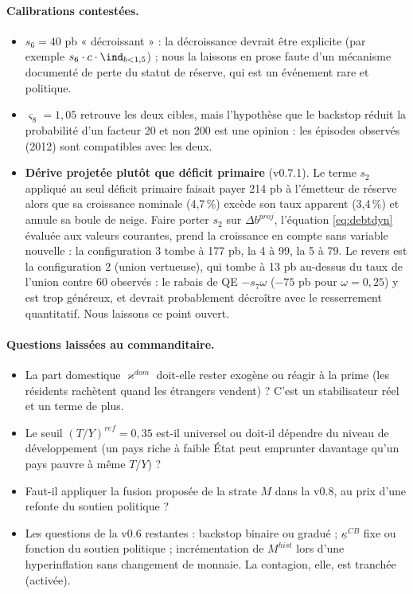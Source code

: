 \documentclass[11pt,a4paper]{article}
\newcommand{\og}{« }
\newcommand{\fg}{ »}
\begin{document}
\paragraph{Calibrations contestées.}
\begin{itemize}
\item $s_6=40$ pb \og décroissant\fg{} : la décroissance devrait être explicite (par exemple $s_6\cdot c\cdot\ind_{b<1{,}5}$) ; nous la laissons en prose faute d'un mécanisme documenté de perte du statut de réserve, qui est un événement rare et politique.
\item $\varsigma_8=1{,}05$ retrouve les deux cibles, mais l'hypothèse que le backstop réduit la probabilité d'un facteur 20 et non 200 est une opinion : les épisodes observés (2012) sont compatibles avec les deux.
\item \textbf{Dérive projetée plutôt que déficit primaire} (v0.7.1). Le terme $s_2$ appliqué au seul déficit primaire faisait payer 214 pb à l'émetteur de réserve alors que sa croissance nominale (4,7\,\%) excède son taux apparent (3,4\,\%) et annule sa boule de neige. Faire porter $s_2$ sur $\Delta b^{proj}$, l'équation \eqref{eq:debtdyn} évaluée aux valeurs courantes, prend la croissance en compte sans variable nouvelle : la configuration 3 tombe à 177 pb, la 4 à 99, la 5 à 79. Le revers est la configuration 2 (union vertueuse), qui tombe à 13 pb au-dessus du taux de l'union contre 60 observés : le rabais de QE $-s_7\omega$ ($-75$ pb pour $\omega=0{,}25$) y est trop généreux, et devrait probablement décroître avec le resserrement quantitatif. Nous laissons ce point ouvert.
\end{itemize}
\paragraph{Questions laissées au commanditaire.}
\begin{itemize}
\item La part domestique $\varkappa^{dom}$ doit-elle rester exogène ou réagir à la prime (les résidents rachètent quand les étrangers vendent) ? C'est un stabilisateur réel et un terme de plus.
\item Le seuil $(T/Y)^{ref}=0{,}35$ est-il universel ou doit-il dépendre du niveau de développement (un pays riche à faible État peut emprunter davantage qu'un pays pauvre à même $T/Y$) ?
\item Faut-il appliquer la fusion proposée de la strate $M$ dans la v0.8, au prix d'une refonte du soutien politique ?
\item Les questions de la v0.6 restantes : backstop binaire ou gradué ; $\underline\kappa^{CB}$ fixe ou fonction du soutien politique ; incrémentation de $M^{hist}$ lors d'une hyperinflation sans changement de monnaie. La contagion, elle, est tranchée (activée).
\end{itemize}
\end{document}
